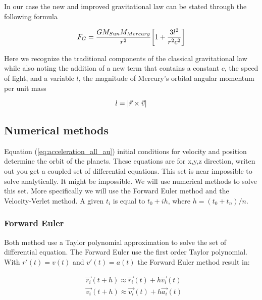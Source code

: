 In our case the new and improved gravitational law can be stated through the following formula

$$F_G = \frac{GM_{Sun}M_{Mercury}}{r^2}\qty[1 + \frac{3l^2}{r^2c^2}]$$

Here we recognize the traditional components of the classical gravitational law while also noting the addition of a new term that contains a constant $c$, the speed of light, and a variable $l$, the magnitude of Mercury's orbital angular momentum per unit mass

$$l = \abs{\vec{r}\times \vec{v}}$$












\subsection{Numerical methods}

Equation (\ref{eq:acceleration_all_au}) initial conditions for velocity and position determine the orbit of the planets. 
These equations are for x,y,z direction, writen out you get a coupled set of differential equations. This set is near impossible to solve analytically. It might be impossible. We will use numerical methods to solve this set. More specifically we will use the Forward Euler method and the Velocity-Verlet method. A given $t_i$ is equal to $t_0 + ih$, where $h = (t_{0} + t_{n})/n $.













\subsubsection{Forward Euler}

Both method use a Taylor polynomial approximation to solve the set of differential equation. The Forward Euler use the first order Taylor polynomial. With $r'(t) = v(t)$ and $v'(t) = a(t)$ the Forward Euler method result in: 
 
\begin{align}
	&\vec{r_i}(t+h) \approx \vec{r_i}(t) + h \vec{v_i}(t)
	\\
	&\vec{v_i}(t+h) \approx \vec{v_i}(t) + h \vec{a_i}(t)
\end{align}

